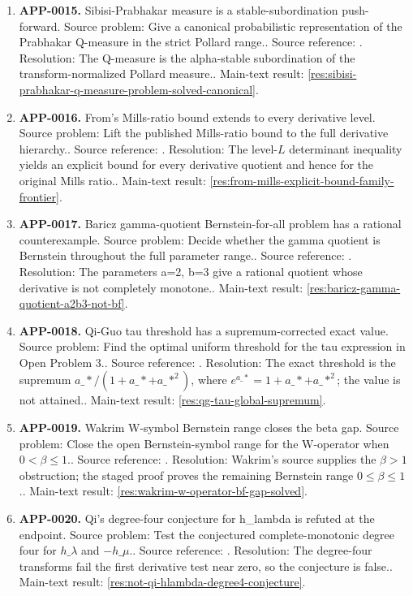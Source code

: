 \begin{enumerate}[leftmargin=*]
\item \textbf{APP-0015.} Sibisi-Prabhakar measure is a stable-subordination push-forward.  Source problem: Give a canonical probabilistic representation of the Prabhakar Q-measure in the strict Pollard range.. Source reference: \cite{app-app-0015-source}. Resolution: The Q-measure is the alpha-stable subordination of the transform-normalized Pollard measure.. Main-text result: \ref{res:sibisi-prabhakar-q-measure-problem-solved-canonical}.
\item \textbf{APP-0016.} From's Mills-ratio bound extends to every derivative level.  Source problem: Lift the published Mills-ratio bound to the full derivative hierarchy.. Source reference: \cite{app-app-0016-source}. Resolution: The level-\(L\) determinant inequality yields an explicit bound for every derivative quotient and hence for the original Mills ratio.. Main-text result: \ref{res:from-mills-explicit-bound-family-frontier}.
\item \textbf{APP-0017.} Baricz gamma-quotient Bernstein-for-all problem has a rational counterexample.  Source problem: Decide whether the gamma quotient is Bernstein throughout the full parameter range.. Source reference: \cite{app-app-0017-source}. Resolution: The parameters a=2, b=3 give a rational quotient whose derivative is not completely monotone.. Main-text result: \ref{res:baricz-gamma-quotient-a2b3-not-bf}.
\item \textbf{APP-0018.} Qi-Guo tau threshold has a supremum-corrected exact value.  Source problem: Find the optimal uniform threshold for the tau expression in Open Problem 3.. Source reference: \cite{app-app-0018-source}. Resolution: The exact threshold is the supremum \(a\_*/(1+a\_*+a\_*^2)\), where \(e^{a\_*}=1+a\_*+a\_*^2\); the value is not attained.. Main-text result: \ref{res:qg-tau-global-supremum}.
\item \textbf{APP-0019.} Wakrim W-symbol Bernstein range closes the beta gap.  Source problem: Close the open Bernstein-symbol range for the W-operator when \(0<\beta\le1\).. Source reference: \cite{app-app-0019-source}. Resolution: Wakrim's source supplies the \(\beta>1\) obstruction; the staged proof proves the remaining Bernstein range \(0\le\beta\le1\).. Main-text result: \ref{res:wakrim-w-operator-bf-gap-solved}.
\item \textbf{APP-0020.} Qi's degree-four conjecture for h\_lambda is refuted at the endpoint.  Source problem: Test the conjectured complete-monotonic degree four for \(h\_\lambda\) and \(-h\_\mu\).. Source reference: \cite{app-app-0020-source}. Resolution: The degree-four transforms fail the first derivative test near zero, so the conjecture is false.. Main-text result: \ref{res:not-qi-hlambda-degree4-conjecture}.

\end{enumerate}
